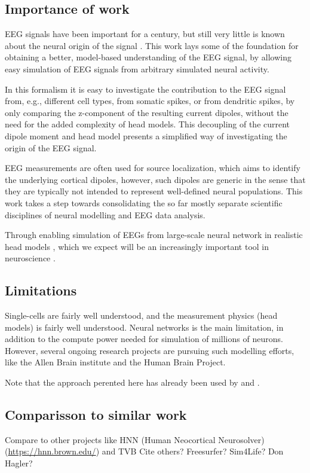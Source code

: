 \documentclass[preprint,10pt,authoryear]{elsarticle}
\begin{document}
\subsection*{Importance of work}
EEG signals have been important for a century, but still very little is known about the neural origin of the signal \citep{COHEN2017}. This work lays some of the foundation for obtaining a better, model-based understanding of the EEG signal, by allowing easy simulation of EEG signals from arbitrary simulated neural activity.

In this formalism it is easy to investigate the contribution to the EEG signal from, e.g., different cell types, from somatic spikes, or from dendritic spikes, by only comparing the z-component of the resulting current dipoles, without the need for the added complexity of head models. This decoupling of the current dipole moment and head model presents a simplified way of investigating the origin of the EEG signal.

EEG measurements are often used for source localization, which aims to identify the underlying cortical dipoles, however, such dipoles are generic in the sense that they are typically not intended to represent well-defined neural populations. This work takes a step towards consolidating the so far mostly separate scientific disciplines of neural modelling and EEG data analysis.

Through enabling simulation of EEGs from large-scale neural network in realistic head models \citep{MARKRAM2015, BILLEH2019}, which we expect will be an increasingly important tool in neuroscience \citep{EINEVOLL2019}.


\subsection*{Limitations}
Single-cells are fairly well understood, and the measurement physics (head models) is fairly well understood. Neural networks is the main limitation, in addition to the compute power needed for simulation of millions of neurons. However, several ongoing research projects are pursuing such modelling efforts, like the Allen Brain institute and the Human Brain Project.


Note that the approach perented here has already been used by \cite{HAGEN2018} and \cite{MAKI2019}.


\subsection*{Comparisson to similar work}
Compare to other projects like HNN (Human Neocortical Neurosolver) (\url{https://hnn.brown.edu/}) and TVB \citep{TVB}
Cite others? Freesurfer? Sim4Life? Don Hagler? 
\end{document}

